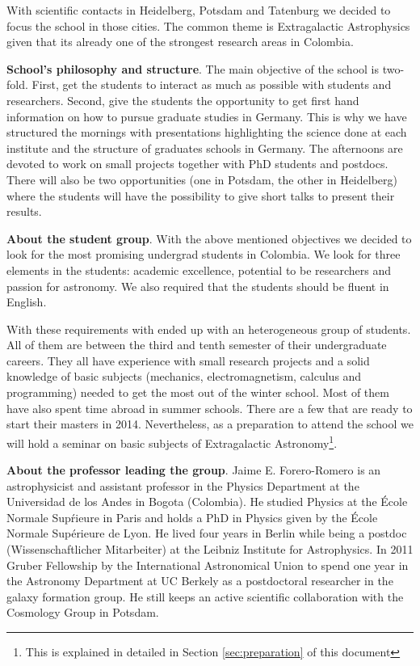\documentclass[12pt]{article}
\begin{document}
With scientific contacts in Heidelberg, Potsdam and Tatenburg we
decided to focus the school in those cities. The common theme is
Extragalactic Astrophysics given that its already one of the strongest
research areas in Colombia. 

{\bf School's philosophy and structure}. The main objective of the school is
two-fold. First, get the students to interact as much as possible with students and
researchers. Second, give the students the opportunity to get first
hand information on how to pursue graduate studies in Germany.  This
is why we have structured the mornings with presentations highlighting
the science done at each institute and the structure of graduates
schools in Germany. The afternoons are devoted to work on small
projects together with PhD students and postdocs. There will also be
two opportunities (one in Potsdam, the other in Heidelberg) where the
students will have the possibility to give short talks to present
their results.

{\bf About the student group}. With the above mentioned objectives we
decided to look for the most promising undergrad students in
Colombia.  We look for three elements in the students: academic
excellence, potential to be researchers and passion for astronomy. We
also required that the students should be fluent in English.

With these requirements with ended up with an heterogeneous group of
students. All of them are between the third and tenth semester of
their undergraduate careers. They all have experience with small
research projects and a solid knowledge of basic subjects 
(mechanics, electromagnetism, calculus and programming) needed to
get the most out of the winter school. Most of them have also spent
time abroad in summer schools.  There are a few that are ready to
start their masters in 2014. Nevertheless, as a preparation to attend
the school we will hold a seminar on basic subjects of Extragalactic
Astronomy\footnote{This is explained in detailed in Section
  \ref{sec:preparation} of this document}.


{\bf About the professor leading the group}. Jaime E. Forero-Romero
is an astrophysicist and assistant professor in the Physics Department
at the Universidad de los Andes in Bogota (Colombia). He studied
Physics at the \'Ecole Normale Sup\'rieure in Paris and holds a PhD in
Physics given by the \'Ecole Normale Supérieure de Lyon. He lived four 
years in Berlin while being a postdoc (Wissenschaftlicher Mitarbeiter)
at the Leibniz Institute for Astrophysics. In 2011 Gruber Fellowship by the
International Astronomical Union to spend one year in the Astronomy
Department at UC Berkely as a postdoctoral researcher in the galaxy
formation group. He still keeps an active scientific collaboration
with the Cosmology Group in Potsdam.
\end{document}
